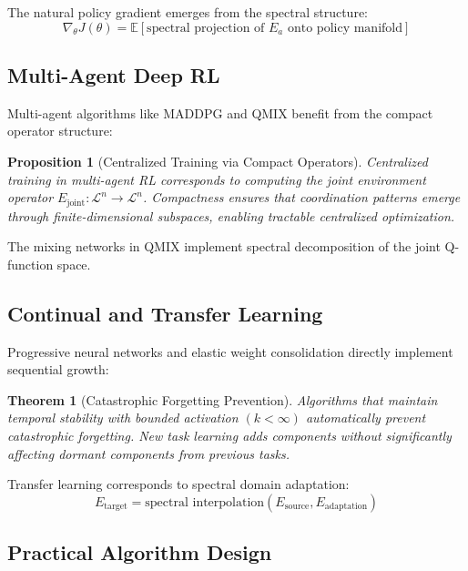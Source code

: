 \documentclass[11pt]{article}
\newtheorem{theorem}{Theorem}
\newtheorem{proposition}{Proposition}
\begin{document}
The natural policy gradient emerges from the spectral structure:
\begin{equation}
\nabla_\theta J(\theta) = \mathbb{E}\left[\text{spectral projection of } E_a \text{ onto policy manifold}\right]
\end{equation}

\subsection{Multi-Agent Deep RL}

Multi-agent algorithms like MADDPG and QMIX benefit from the compact operator structure:

\begin{proposition}[Centralized Training via Compact Operators]
Centralized training in multi-agent RL corresponds to computing the joint environment operator $E_{\text{joint}}: \mathcal{L}^n \to \mathcal{L}^n$. Compactness ensures that coordination patterns emerge through finite-dimensional subspaces, enabling tractable centralized optimization.
\end{proposition}

The mixing networks in QMIX implement spectral decomposition of the joint Q-function space.

\subsection{Continual and Transfer Learning}

Progressive neural networks and elastic weight consolidation directly implement sequential growth:

\begin{theorem}[Catastrophic Forgetting Prevention]
Algorithms that maintain temporal stability with bounded activation $(k < \infty)$ automatically prevent catastrophic forgetting. New task learning adds components without significantly affecting dormant components from previous tasks.
\end{theorem}

Transfer learning corresponds to spectral domain adaptation:
\begin{equation}
E_{\text{target}} = \text{spectral interpolation}(E_{\text{source}}, E_{\text{adaptation}})
\end{equation}

\subsection{Practical Algorithm Design}
\end{document}
